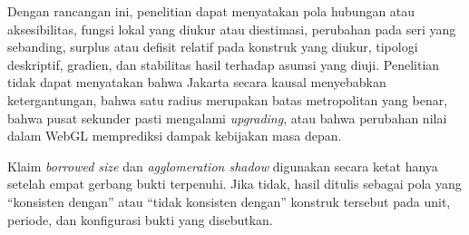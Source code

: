 \documentclass[11pt,a4paper,oneside,openany,indonesian]{report}
\begin{document}
Dengan rancangan ini, penelitian dapat menyatakan pola hubungan atau
aksesibilitas, fungsi lokal yang diukur atau diestimasi, perubahan pada
seri yang sebanding, surplus atau defisit relatif pada konstruk yang
diukur, tipologi deskriptif, gradien, dan stabilitas hasil terhadap
asumsi yang diuji. Penelitian tidak dapat menyatakan bahwa Jakarta
secara kausal menyebabkan ketergantungan, bahwa satu radius merupakan
batas metropolitan yang benar, bahwa pusat sekunder pasti mengalami
\emph{upgrading}, atau bahwa perubahan nilai dalam WebGL memprediksi
dampak kebijakan masa depan.

Klaim \emph{borrowed size} dan \emph{agglomeration shadow} digunakan
secara ketat hanya setelah empat gerbang bukti terpenuhi. Jika tidak,
hasil ditulis sebagai pola yang ``konsisten dengan'' atau ``tidak
konsisten dengan'' konstruk tersebut pada unit, periode, dan konfigurasi
bukti yang disebutkan.
\end{document}
